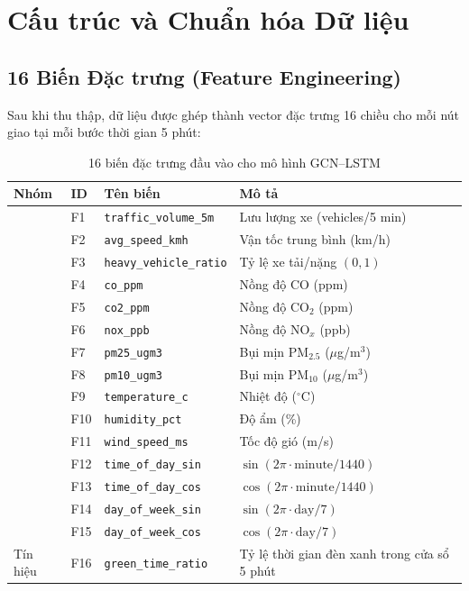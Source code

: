 \section{Cấu trúc và Chuẩn hóa Dữ liệu}
\subsection{16 Biến Đặc trưng (Feature Engineering)}
Sau khi thu thập, dữ liệu được ghép thành vector đặc trưng 16 chiều cho mỗi nút giao tại mỗi bước thời gian 5 phút:
\begin{table}[H]
\centering
\caption{16 biến đặc trưng đầu vào cho mô hình GCN–LSTM}
\label{tab:features}
\renewcommand{\arraystretch}{1.4}
\begin{tabular}{>{\centering}p{1.5cm} >{\centering}p{0.8cm} p{3.5cm} p{5cm}}
\toprule
\textbf{Nhóm} & \textbf{ID} & \textbf{Tên biến} & \textbf{Mô tả} \\
\midrule
\multirow{3}{*}{Giao thông} & F1 & \texttt{traffic\_volume\_5m} & Lưu lượng xe (vehicles/5 min) \\
  & F2 & \texttt{avg\_speed\_kmh} & Vận tốc trung bình (km/h) \\
  & F3 & \texttt{heavy\_vehicle\_ratio} & Tỷ lệ xe tải/nặng $(0, 1)$ \\
\midrule
\rowcolor{rowgray}
\multirow{5}{*}{Khí thải} & F4 & \texttt{co\_ppm} & Nồng độ CO (ppm) \\
\rowcolor{rowgray}
  & F5 & \texttt{co2\_ppm} & Nồng độ CO$_2$ (ppm) \\
\rowcolor{rowgray}
  & F6 & \texttt{nox\_ppb} & Nồng độ NO$_x$ (ppb) \\
\rowcolor{rowgray}
  & F7 & \texttt{pm25\_ugm3} & Bụi mịn PM$_{2.5}$ ($\mu$g/m$^3$) \\
\rowcolor{rowgray}
  & F8 & \texttt{pm10\_ugm3} & Bụi mịn PM$_{10}$ ($\mu$g/m$^3$) \\
\midrule
\multirow{3}{*}{Khí tượng} & F9 & \texttt{temperature\_c} & Nhiệt độ ($^\circ$C) \\
  & F10 & \texttt{humidity\_pct} & Độ ẩm (\%) \\
  & F11 & \texttt{wind\_speed\_ms} & Tốc độ gió (m/s) \\
\midrule
\rowcolor{rowgray}
\multirow{5}{*}{Thời gian} & F12 & \texttt{time\_of\_day\_sin} & $\sin(2\pi \cdot \text{minute}/1440)$ \\
  & F13 & \texttt{time\_of\_day\_cos} & $\cos(2\pi \cdot \text{minute}/1440)$ \\
  & F14 & \texttt{day\_of\_week\_sin} & $\sin(2\pi \cdot \text{day}/7)$ \\
  & F15 & \texttt{day\_of\_week\_cos} & $\cos(2\pi \cdot \text{day}/7)$ \\
\midrule
\rowcolor{rowgray}
Tín hiệu & F16 & \texttt{green\_time\_ratio} & Tỷ lệ thời gian đèn xanh trong cửa sổ 5 phút \\
\bottomrule
\end{tabular}
\end{table}
